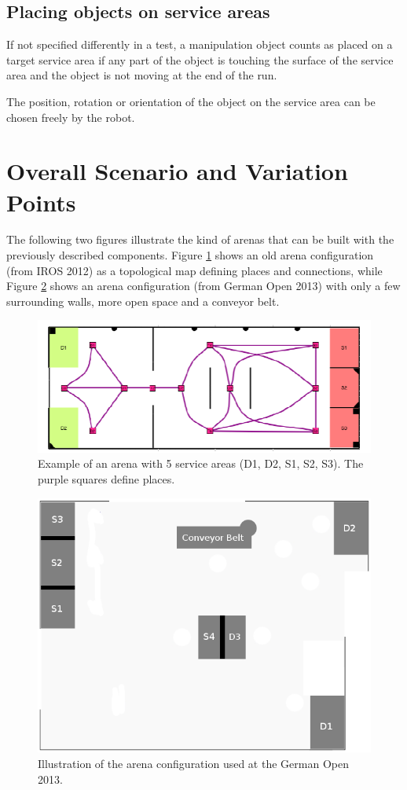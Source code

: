 \subsection{Placing objects on service areas}
If not specified differently in a test, a manipulation object counts as placed on a target service area if any part of the object is touching the surface of the service area and the object is not moving at the end of the run.
\par
The position, rotation or orientation of the object on the service area can be chosen freely by the robot.

\section{Overall Scenario and Variation Points}
The following two figures illustrate the kind of arenas that can be built with the previously described components. Figure \ref{fig:example_map} shows an old arena configuration (from IROS 2012) as a topological map defining places and connections, while Figure \ref{fig:example_map_go13} shows an arena configuration (from German Open 2013) with only a few surrounding walls, more open space and a conveyor belt.

\begin{figure}
\includegraphics[width= \textwidth ]{../images/example_map.png}
\caption{Example of an arena with 5 service areas (D1, D2, S1, S2, S3). The purple squares define places.}
\label{fig:example_map}
\end{figure}

\begin{figure}
\includegraphics[width= \textwidth ]{../images/example_map_go13.png}
\caption{Illustration of the arena configuration used at the German Open 2013.}
\label{fig:example_map_go13}
\end{figure}

